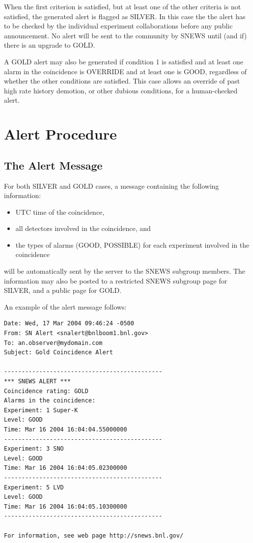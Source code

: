 \documentclass{article}
\begin{document}
When the first criterion is satisfied, but at least one of the other
criteria is not satisfied, the generated alert is flagged as SILVER.
In this case the the alert has to be checked by the individual
experiment collaborations before any public announcement. No alert
will be sent to the community by SNEWS until (and if) there is an
upgrade to GOLD.

A GOLD alert may also be generated if condition 1 is satisfied and
at least one alarm in the coincidence is OVERRIDE and at least one
is GOOD, regardless of whether the other conditions
are satisfied. This case allows an override of past high rate history
demotion, or other dubious conditions,  for a human-checked alert.

\section{Alert Procedure}

\subsection{The Alert Message}

For both SILVER and GOLD cases, a message containing the following
information:

\begin{itemize}
\item UTC time of the coincidence,
\item all detectors involved in the coincidence, and
\item the types of alarms (GOOD, POSSIBLE) for each experiment involved
in the coincidence
\end{itemize}

will be automatically sent by the server to the SNEWS subgroup
members.   The information may also be posted to a restricted SNEWS
subgroup page for SILVER, and a public page for GOLD.

An example of the alert message follows:

\begin{verbatim}
Date: Wed, 17 Mar 2004 09:46:24 -0500
From: SN Alert <snalert@bnlboom1.bnl.gov>
To: an.observer@mydomain.com
Subject: Gold Coincidence Alert

---------------------------------------------
*** SNEWS ALERT ***
Coincidence rating: GOLD
Alarms in the coincidence:
Experiment: 1 Super-K
Level: GOOD
Time: Mar 16 2004 16:04:04.55000000
---------------------------------------------
Experiment: 3 SNO
Level: GOOD 
Time: Mar 16 2004 16:04:05.02300000
---------------------------------------------
Experiment: 5 LVD
Level: GOOD 
Time: Mar 16 2004 16:04:05.10300000
---------------------------------------------

For information, see web page http://snews.bnl.gov/

\end{verbatim}
\end{document}
